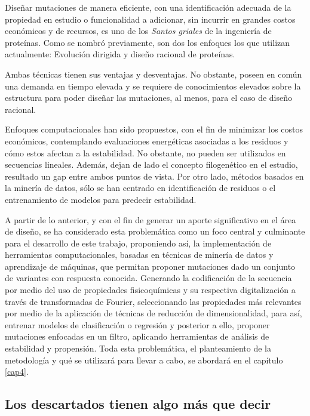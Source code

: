 Diseñar mutaciones de manera eficiente, con una identificación adecuada de la propiedad en estudio o funcionalidad a adicionar, sin incurrir en grandes costos económicos y de recursos, es uno de los \textit{Santos griales} de la ingeniería de proteínas. Como se nombró previamente, son dos los enfoques los que utilizan actualmente: Evolución dirigida y diseño racional de proteínas.

Ambas técnicas tienen sus ventajas y desventajas. No obstante, poseen en común una demanda en tiempo elevada y se requiere de conocimientos elevados sobre la estructura para poder diseñar las mutaciones, al menos, para el caso de diseño racional. 

Enfoques computacionales han sido propuestos, con el fin de minimizar los costos económicos, contemplando evaluaciones energéticas asociadas a los residuos y cómo estos afectan a la estabilidad. No obstante, no pueden ser utilizados en secuencias lineales. Además, dejan de lado el concepto filogenético en el estudio, resultado un gap entre ambos puntos de vista. Por otro lado, métodos basados en la minería de datos, sólo se han centrado en identificación de residuos o el entrenamiento de modelos para predecir estabilidad.

A partir de lo anterior, y con el fin de generar un aporte significativo en el área de diseño, se ha considerado esta problemática como un foco central y culminante para el desarrollo de este trabajo, proponiendo así, la implementación de  herramientas computacionales, basadas en técnicas de minería de datos y aprendizaje de máquinas, que permitan proponer mutaciones dado un conjunto de variantes con respuesta conocida. Generando la codificación de la secuencia por medio del uso de propiedades fisicoquímicas y su respectiva digitalización a través de transformadas de Fourier, seleccionando las propiedades más relevantes por medio de la aplicación de técnicas de reducción de dimensionalidad, para así, entrenar modelos de clasificación o regresión y posterior a ello, proponer mutaciones enfocadas en un filtro, aplicando herramientas de análisis de estabilidad y propensión. Toda esta problemática, el planteamiento de la metodología y qué se utilizará para llevar a cabo, se abordará en el capítulo \ref{cap4}.


\subsection{Los descartados tienen algo más que decir}

